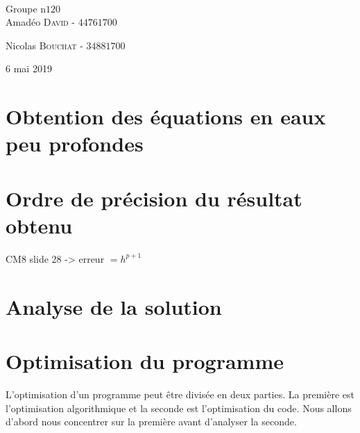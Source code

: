 \documentclass{article}
\begin{document}
\begin{titlepage}
	\HRule\\[1.5cm]
	
	
	Groupe n\degree$120$\\[0.2cm]
	Amadéo \textsc{David}  - $4476 1700$%
	
	Nicolas \textsc{Bouchat} - $3488 1700$%
	
	
	\vfill\vfill\vfill %
	
	{\large 6 mai 2019} %
	
	
	\vfill %
	
\end{titlepage}
\section{Obtention des équations en eaux peu profondes}
\section{Ordre de précision du résultat obtenu}
	CM8 slide 28 -> erreur $ = h^{p+1}$
\section{Analyse de la solution}
\section{Optimisation du programme}
	L'optimisation d'un programme peut être divisée en deux parties. 
	La première est l'optimisation algorithmique et la seconde est l'optimisation du code. 
	Nous allons d'abord nous concentrer sur la première avant d'analyser la seconde.
\end{document}
